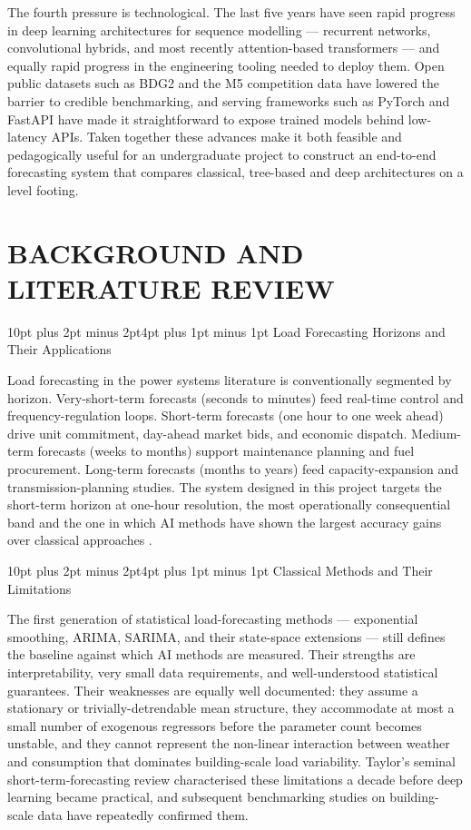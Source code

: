 \documentclass[12pt,a4paper,openany]{report}
\makeatletter
\renewcommand{\section}{\@startsection{section}{1}{\z@}%
  {10pt plus 2pt minus 2pt}{4pt plus 1pt minus 1pt}%
  {\normalfont\normalsize\bfseries}}
\makeatother
\begin{document}
The fourth pressure is technological. The last five years have seen rapid progress in deep learning architectures for sequence modelling --- recurrent networks, convolutional hybrids, and most recently attention-based transformers --- and equally rapid progress in the engineering tooling needed to deploy them. Open public datasets such as BDG2 and the M5 competition data have lowered the barrier to credible benchmarking, and serving frameworks such as PyTorch and FastAPI have made it straightforward to expose trained models behind low-latency APIs. Taken together these advances make it both feasible and pedagogically useful for an undergraduate project to construct an end-to-end forecasting system that compares classical, tree-based and deep architectures on a level footing.


\chapter{BACKGROUND AND LITERATURE REVIEW}

\section{Load Forecasting Horizons and Their Applications}

Load forecasting in the power systems literature is conventionally segmented by horizon. Very-short-term forecasts (seconds to minutes) feed real-time control and frequency-regulation loops. Short-term forecasts (one hour to one week ahead) drive unit commitment, day-ahead market bids, and economic dispatch. Medium-term forecasts (weeks to months) support maintenance planning and fuel procurement. Long-term forecasts (months to years) feed capacity-expansion and transmission-planning studies. The system designed in this project targets the short-term horizon at one-hour resolution, the most operationally consequential band and the one in which AI methods have shown the largest accuracy gains over classical approaches \cite{ref_taylor_short_term, ref_makridakis_m4}.

\section{Classical Methods and Their Limitations}

The first generation of statistical load-forecasting methods --- exponential smoothing, ARIMA, SARIMA, and their state-space extensions --- still defines the baseline against which AI methods are measured. Their strengths are interpretability, very small data requirements, and well-understood statistical guarantees. Their weaknesses are equally well documented: they assume a stationary or trivially-detrendable mean structure, they accommodate at most a small number of exogenous regressors before the parameter count becomes unstable, and they cannot represent the non-linear interaction between weather and consumption that dominates building-scale load variability. Taylor's seminal short-term-forecasting review \cite{ref_taylor_short_term} characterised these limitations a decade before deep learning became practical, and subsequent benchmarking studies on building-scale data have repeatedly confirmed them.
\end{document}

